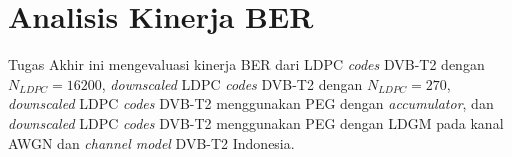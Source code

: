 

\section{Analisis Kinerja BER}
Tugas Akhir ini mengevaluasi kinerja BER dari LDPC \textit{codes} DVB-T2 dengan $N_{LDPC}=16200$, \textit{downscaled} LDPC \textit{codes} DVB-T2 dengan $N_{LDPC}=270$, \textit{downscaled} LDPC \textit{codes} DVB-T2 menggunakan PEG dengan \textit{accumulator}, dan \textit{downscaled} LDPC \textit{codes} DVB-T2 menggunakan PEG dengan LDGM pada kanal AWGN dan \textit{channel model} DVB-T2 Indonesia.


